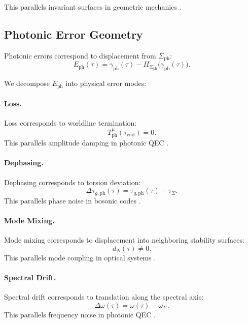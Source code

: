 \documentclass[aip,jmp,reprint,onecolumn,nofootinbib]{revtex4-2}
\begin{document}
This parallels invariant surfaces in geometric mechanics \cite{ArnoldMechanics}.

\subsection{Photonic Error Geometry}

Photonic errors correspond to displacement from $\Sigma_{\mathrm{ph}}$:
\begin{equation}
E_{\mathrm{ph}}(\tau)
=
\gamma_{\mathrm{ph}}(\tau) - \Pi_{\Sigma_{\mathrm{ph}}}\big(\gamma_{\mathrm{ph}}(\tau)\big).
\end{equation}

We decompose $E_{\mathrm{ph}}$ into physical error modes:

\paragraph{Loss.}
Loss corresponds to worldline termination:
\begin{equation}
T^\mu_{\mathrm{ph}}(\tau_{\mathrm{end}}) = 0.
\end{equation}
This parallels amplitude damping in photonic QEC \cite{NohGirvinQEC}.

\paragraph{Dephasing.}
Dephasing corresponds to torsion deviation:
\begin{equation}
\Delta\tau_{g,\mathrm{ph}}(\tau)
=
\tau_{g,\mathrm{ph}}(\tau) - \tau_{\Sigma}.
\end{equation}
This parallels phase noise in bosonic codes \cite{GottesmanQEC}.

\paragraph{Mode Mixing.}
Mode mixing corresponds to displacement into neighboring stability surfaces:
\begin{equation}
d_N(\tau) \neq 0.
\end{equation}
This parallels mode coupling in optical systems \cite{BornWolf}.

\paragraph{Spectral Drift.}
Spectral drift corresponds to translation along the spectral axis:
\begin{equation}
\Delta\omega(\tau) = \omega(\tau) - \omega_{\Sigma}.
\end{equation}
This parallels frequency noise in photonic QEC \cite{PreskillQEC}.
\end{document}
